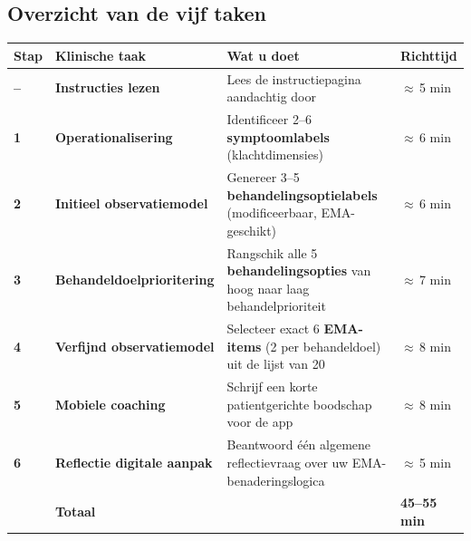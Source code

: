 \documentclass[11pt,a4paper]{article}
\renewcommand{\arraystretch}{1.28}
\begin{document}
\vspace{0.5em}

\subsection*{Overzicht van de vijf taken}

\begin{center}
\renewcommand{\arraystretch}{1.36}
\small
\begin{tabular}{@{}>{\bfseries\color{PrimaryBlue}}p{}>{\bfseries}p{}p{}p{}@{}}
\toprule
Stap & Klinische taak & Wat u doet & Richttijd \\
\midrule
-- & Instructies lezen & Lees de instructiepagina aandachtig door & $\approx$\,5 min \\
1 & Operationalisering & Identificeer 2--6 \textbf{symptoomlabels} (klachtdimensies) & $\approx$\,6 min \\
2 & Initieel observatiemodel & Genereer 3--5 \textbf{behandelingsoptielabels} (modificeerbaar, EMA-geschikt) & $\approx$\,6 min \\
3 & Behandeldoelprioritering & Rangschik alle 5 \textbf{behandelingsopties} van hoog naar laag behandelprioriteit & $\approx$\,7 min \\
4 & Verfijnd observatiemodel & Selecteer exact 6 \textbf{EMA-items} (2 per behandeldoel) uit de lijst van 20 & $\approx$\,8 min \\
5 & Mobiele coaching & Schrijf een korte patientgerichte boodschap voor de app & $\approx$\,8 min \\
6 & Reflectie digitale aanpak & Beantwoord één algemene reflectievraag over uw EMA-benaderingslogica & $\approx$\,5 min \\
\midrule
 & \textbf{Totaal} & & \textbf{45--55 min} \\
\bottomrule
\end{tabular}
\end{center}
\end{document}
